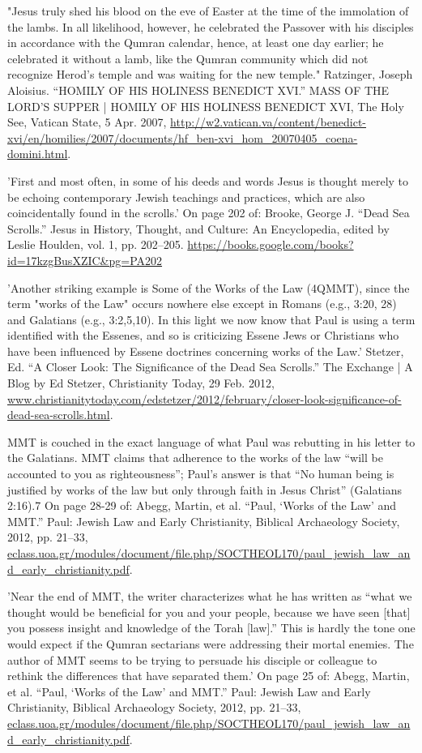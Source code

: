 \documentclass[11pt]{article}
\begin{document}
\begin{thebibliography}{37}
"Jesus truly shed his blood on the eve of Easter at the time of the immolation of the lambs. 
In all likelihood, however, he celebrated the Passover with his disciples in accordance with the Qumran calendar, hence, at least one day earlier; he celebrated it without a lamb, like the Qumran community which did not recognize Herod's temple and was waiting for the new temple."
Ratzinger, Joseph Aloisius. “HOMILY OF HIS HOLINESS BENEDICT XVI.” MASS OF THE LORD'S SUPPER | HOMILY OF HIS HOLINESS BENEDICT XVI, The Holy See, Vatican State, 5 Apr. 2007, \url{http://w2.vatican.va/content/benedict-xvi/en/homilies/2007/documents/hf_ben-xvi_hom_20070405_coena-domini.html}.


'First and most often, in some of his deeds and words Jesus is thought merely to be echoing contemporary Jewish teachings and practices, which are also coincidentally found in the scrolls.'
On page 202 of:
Brooke, George J. “Dead Sea Scrolls.” Jesus in History, Thought, and Culture: An Encyclopedia, edited by Leslie Houlden, vol. 1, pp. 202–205. \url{https://books.google.com/books?id=17kzgBusXZIC&pg=PA202}

'Another striking example is Some of the Works of the Law (4QMMT), since the term "works of the Law" occurs nowhere else except in Romans (e.g., 3:20, 28) and Galatians (e.g., 3:2,5,10). In this light we now know that Paul is using a term identified with the Essenes, and so is criticizing Essene Jews or Christians who have been influenced by Essene doctrines concerning works of the Law.' 
Stetzer, Ed. “A Closer Look: The Significance of the Dead Sea Scrolls.” The Exchange | A Blog by Ed Stetzer, Christianity Today, 29 Feb. 2012, \url{www.christianitytoday.com/edstetzer/2012/february/closer-look-significance-of-dead-sea-scrolls.html}.

MMT is couched in the exact language of what Paul was rebutting in his
letter to the Galatians. MMT claims that adherence to the works of the law “will
be accounted to you as righteousness”; Paul’s answer is that “No human being is justified by works of the law but only through faith in Jesus Christ” (Galatians
2:16).7
On page 28-29 of:
Abegg, Martin, et al. “Paul, ‘Works of the Law’ and MMT.” Paul: Jewish Law and Early Christianity, Biblical Archaeology Society, 2012, pp. 21–33, \url{eclass.uoa.gr/modules/document/file.php/SOCTHEOL170/paul_jewish_law_and_early_christianity.pdf}.

'Near the end of MMT, the writer characterizes what he has written
as “what we thought would be beneficial for you and your people, because we
have seen [that] you possess insight and knowledge of the Torah [law].” This is
hardly the tone one would expect if the Qumran sectarians were addressing their
mortal enemies. The author of MMT seems to be trying to persuade his disciple
or colleague to rethink the differences that have separated them.'
On page 25 of:
Abegg, Martin, et al. “Paul, ‘Works of the Law’ and MMT.” Paul: Jewish Law and Early Christianity, Biblical Archaeology Society, 2012, pp. 21–33, \url{eclass.uoa.gr/modules/document/file.php/SOCTHEOL170/paul_jewish_law_and_early_christianity.pdf}.


\end{thebibliography}
\end{document}
